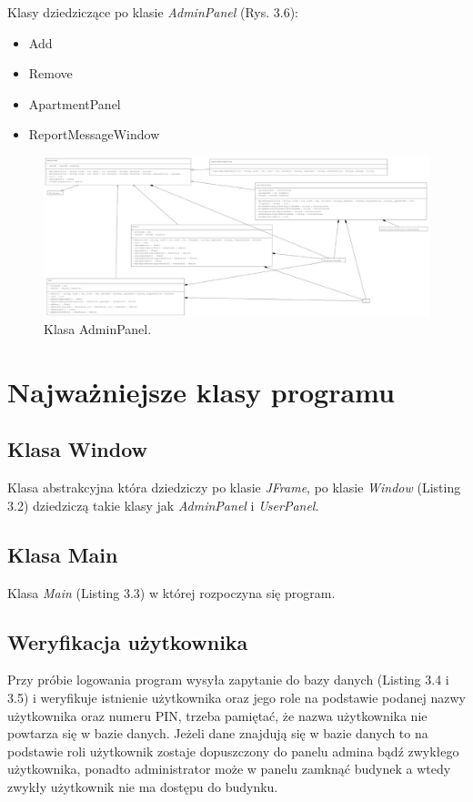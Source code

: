 \noindent Klasy dziedziczące po klasie \textit{AdminPanel} (Rys. 3.6):
\begin{itemize}
    \item Add
    \item Remove
    \item ApartmentPanel
    \item ReportMessageWindow
\end{itemize}

\begin{figure}[H]
    \centering
    \includegraphics[width=\textwidth,height=1\textheight,keepaspectratio]{figures/UML/admin-extends.eps}
    \caption{Klasa AdminPanel.\label{fig24}}
\end{figure}

\newpage
\section{Najważniejsze klasy programu}
\subsection{Klasa Window}
Klasa abstrakcyjna która dziedziczy po klasie \textit{JFrame}, po klasie \textit{Window} (Listing 3.2) dziedziczą takie klasy jak \textit{AdminPanel} i \textit{UserPanel}.


\newpage
\subsection{Klasa Main}
Klasa \textit{Main} (Listing 3.3) w której rozpoczyna się program.


\subsection{Weryfikacja użytkownika}
Przy próbie logowania program wysyła zapytanie do bazy danych (Listing 3.4 i 3.5) i weryfikuje istnienie użytkownika oraz jego role na podstawie podanej
nazwy użytkownika oraz numeru PIN, trzeba pamiętać, że nazwa użytkownika nie powtarza się w bazie danych. Jeżeli dane znajdują się 
w bazie danych to na podstawie roli użytkownik zostaje dopuszczony do panelu admina bądź zwykłego użytkownika, ponadto administrator 
może w panelu zamknąć budynek a wtedy zwykły użytkownik nie ma dostępu do budynku.


